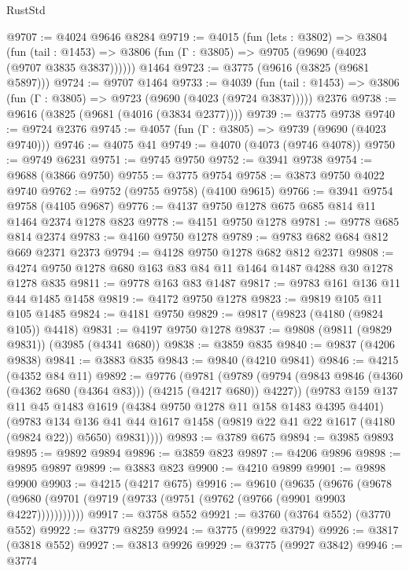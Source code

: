 \begin{lexlean}{RustStd}
\begin{coremodule}
{\begin{coremodule}
{{{{{{{{{{{{{{{{{{{{{{{{{{{{{{{@9707 := @4024 @9646 @8284
@9719 := @4015
    (fun (lets : @3802) =>
    @3804
      (fun (tail : @1453) => @3806 (fun (Γ : @3805) => @9705 (@9690 (@4023 (@9707 @3835 @3837))))))
    @1464
@9723 := @3775 (@9616 (@3825 (@9681 @5897)))
@9724 := @9707 @1464
@9733 := @4039
    (fun (tail : @1453) => @3806 (fun (Γ : @3805) => @9723 (@9690 (@4023 (@9724 @3837)))))
    @2376
@9738 := @9616 (@3825 (@9681 (@4016 (@3834 @2377))))
@9739 := @3775 @9738
@9740 := @9724 @2376
@9745 := @4057 (fun (Γ : @3805) => @9739 (@9690 (@4023 @9740)))
@9746 := @4075 @41
@9749 := @4070 (@4073 (@9746 @4078))
@9750 := @9749 @6231
@9751 := @9745 @9750
@9752 := @3941 @9738
@9754 := @9688 (@3866 @9750)
@9755 := @3775 @9754
@9758 := @3873 @9750 @4022 @9740
@9762 := @9752 (@9755 @9758) (@4100 @9615)
@9766 := @3941 @9754 @9758 (@4105 @9687)
@9776 := @4137 @9750 @1278 @675 @685 @814 @11 @1464 @2374 @1278 @823
@9778 := @4151 @9750 @1278
@9781 := @9778 @685 @814 @2374
@9783 := @4160 @9750 @1278
@9789 := @9783 @682 @684 @812 @669 @2371 @2373
@9794 := @4128 @9750 @1278 @682 @812 @2371
@9808 := @4274 @9750 @1278 @680 @163 @83 @84 @11 @1464 @1487 @4288 @30 @1278 @1278 @835
@9811 := @9778 @163 @83 @1487
@9817 := @9783 @161 @136 @11 @44 @1485 @1458
@9819 := @4172 @9750 @1278
@9823 := @9819 @105 @11 @105 @1485
@9824 := @4181 @9750
@9829 := @9817 (@9823 (@4180 (@9824 @105)) @4418)
@9831 := @4197 @9750 @1278
@9837 := @9808 (@9811 (@9829 @9831)) (@3985 (@4341 @680))
@9838 := @3859 @835
@9840 := @9837 (@4206 @9838)
@9841 := @3883 @835
@9843 := @9840 (@4210 @9841)
@9846 := @4215 (@4352 @84 @11)
@9892 := @9776
    (@9781
      (@9789
        (@9794 (@9843 @9846 (@4360 (@4362 @680 (@4364 @83))) (@4215 (@4217 @680)) @4227))
        (@9783
          @159
          @137
          @11
          @45
          @1483
          @1619
          (@4384 @9750 @1278 @11 @158 @1483 @4395 @4401)
          (@9783
            @134
            @136
            @41
            @44
            @1617
            @1458
            (@9819 @22 @41 @22 @1617 (@4180 (@9824 @22)) @5650)
            @9831))))
@9893 := @3789 @675
@9894 := @3985 @9893
@9895 := @9892 @9894
@9896 := @3859 @823
@9897 := @4206 @9896
@9898 := @9895 @9897
@9899 := @3883 @823
@9900 := @4210 @9899
@9901 := @9898 @9900
@9903 := @4215 (@4217 @675)
@9916 := @9610
    (@9635
      (@9676 (@9678 (@9680 (@9701 (@9719 (@9733 (@9751 (@9762 (@9766 (@9901 @9903 @4227)))))))))))
@9917 := @3758 @552
@9921 := @3760 (@3764 @552) (@3770 @552)
@9922 := @3779 @8259
@9924 := @3775 (@9922 @3794)
@9926 := @3817 (@3818 @552)
@9927 := @3813 @9926
@9929 := @3775 (@9927 @3842)
@9946 := @3774
}}}}}}}}}}}}}}}}}}}}}}}}}}}}}}}
\end{coremodule}}
\end{coremodule}
\end{lexlean}
